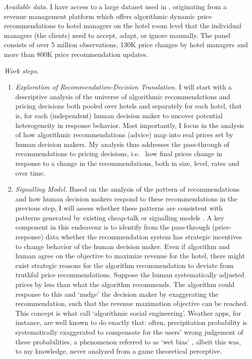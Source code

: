 \documentclass[12pt,a4paper]{article}
\begin{document}
\emph{Available data.} I have access to a large dataset used in \citet{GTW2021demandest}, originating from a revenue management platform which offers algorithmic dynamic price recommendations to hotel managers on the hotel room level that the individual managers (the clients) need to accept, adapt, or ignore manually. The panel consists of over 5 million observations, 130K price changes by hotel managers and more than 800K price recommendation updates.

\emph{Work steps.}
\begin{enumerate}
	\item \emph{Exploration of Recommendation-Decision Translation.} I will start with a descriptive analysis of the universe of algorithmic recommendations and pricing decisions both pooled over hotels and separately for each hotel, that is, for each (independent) human decision maker to uncover potential heterogeneity in response behavior.
Most importantly, I focus in the analysis of how algorithmic recommendations (advice) map into real prices set by human decision makers. My analysis thus addresses the pass-through of recommendations to pricing decisions, i.e.~ how final prices change in response to a change in the recommendations, both in size, level, rates and over time.

\item \emph{Signalling Model.} Based on the analysis of the pattern of recommendations and how human decision makers respond to these recommendations in the previous step, I will assess whether these patterns are consistent with patterns generated by existing cheap-talk or signalling models \citep[see][]{crawford1982strategic, sobel2013givingadvice, backus2019empirical}. A key component in this endeavour is to identify from the pass-through (price-response) data whether the recommendation system has strategic incentives to change behavior of the human decision maker. Even if algorithm and human agree on the objective to maximize revenue for the hotel, there might exist strategic reasons for the algorithm recommendation to deviate from truthful price recommendations. Suppose the human systematically adjusted prices by less than what the algorithm recommends. The algorithm could response to this and `nudge' the decision maker by exaggerating the recommendation, such that the revenue maximation objective can be reached. This concept is what \citet{cowgill2020algorithmic} call `algorithmic social engineering'. Weather apps, for instance, are well known to do exactly that: often, precipitation probability is systematically exaggerated to compensate for the users' wrong judgement of these probabilities, a phenomenon referred to as `wet bias' \citep{wetbias1}, albeit this was, to my knowledge, never analyzed from a game theoretical perceptive.


\end{enumerate}
\end{document}
